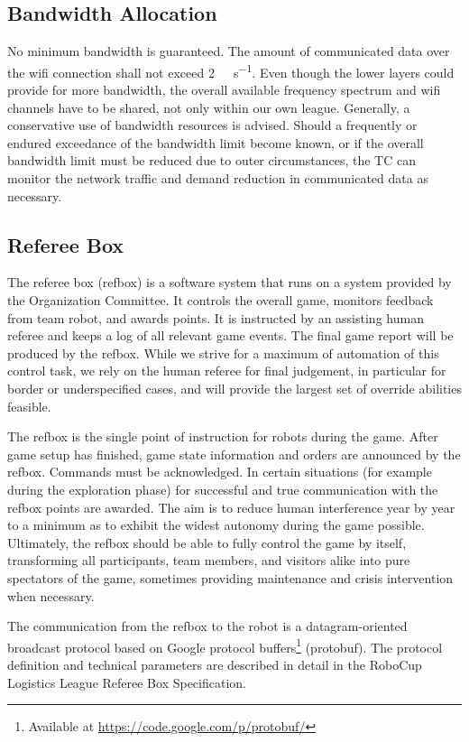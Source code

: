 \documentclass[12pt,twoside]{article}
\begin{document}
\subsection{Bandwidth Allocation}
\label{sec:bandwidth}
No minimum bandwidth is guaranteed. The amount of communicated data
over the wifi connection shall not exceed
\SI{2}{\mega\bit\per\second}. Even though the lower layers could
provide for more bandwidth, the overall available frequency spectrum
and wifi channels have to be shared, not only within our own
league. Generally, a conservative use of bandwidth resources is
advised. Should a frequently or endured exceedance of the bandwidth
limit become known, or if the overall bandwidth limit must be reduced
due to outer circumstances, the TC can monitor the network traffic and
demand reduction in communicated data as necessary.

\subsection{Referee Box}
\label{sec:refbox}
The referee box (refbox) is a software system that runs on a system
provided by the Organization Committee. It controls the overall game,
monitors feedback from team robot, and awards points. It is instructed
by an assisting human referee and keeps a log of all relevant game
events. The final game report will be produced by the refbox. While we
strive for a maximum of automation of this control task, we rely on
the human referee for final judgement, in particular for border or
underspecified cases, and will provide the largest set of override
abilities feasible.

The refbox is the single point of instruction for robots during the
game. After game setup has finished, game state information and orders
are announced by the refbox. Commands must be acknowledged. In certain
situations (for example during the exploration phase) for successful
and true communication with the refbox points are awarded. The aim is
to reduce human interference year by year to a minimum as to exhibit
the widest autonomy during the game possible. Ultimately, the refbox
should be able to fully control the game by itself, transforming all
participants, team members, and visitors alike into pure spectators of
the game, sometimes providing maintenance and crisis intervention when
necessary.

The communication from the refbox to the robot is a datagram-oriented
broadcast protocol based on Google protocol buffers\footnote{Available
  at \url{https://code.google.com/p/protobuf/}} (protobuf). The
protocol definition and technical parameters are described in detail
in the RoboCup Logistics League Referee Box Specification.
\end{document}
